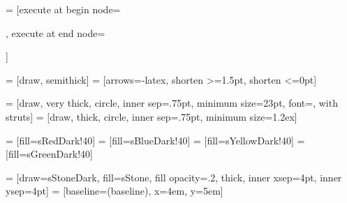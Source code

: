 \usepackage{tikz}
\usetikzlibrary{arrows.meta}
\usetikzlibrary{backgrounds}
\usetikzlibrary{fit}
\usetikzlibrary{scopes}

 = [execute at begin node={\strut}, execute at end node={\strut}]

 = [draw, semithick]
 = [arrows={-latex}, shorten >=1.5pt, shorten <=0pt]

 = [draw, very thick, circle, inner sep=.75pt, minimum size=23pt, font=\small, with struts]
 = [draw, thick, circle, inner sep=.75pt, minimum size=1.2ex]

 = [fill=sRedDark!40]
 = [fill=sBlueDark!40]
 = [fill=sYellowDark!40]
 = [fill=sGreenDark!40]

 = [draw=sStoneDark, fill=sStone, fill opacity=.2, thick, inner xsep=4pt, inner ysep=4pt]
 = [baseline=(baseline), x=4em, y=5em]
